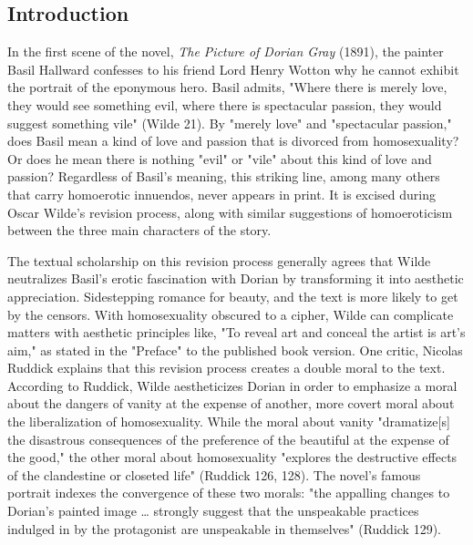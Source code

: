 \documentclass[11pt]{article}
\begin{document}
\subsection{Introduction}
\label{sec:orgcdb88e2}

In the first scene of the novel, \emph{The Picture of Dorian Gray} (1891),
the painter Basil Hallward confesses to his friend Lord Henry Wotton
why he cannot exhibit the portrait of the eponymous hero. Basil
admits, "Where there is merely love, they would see something evil,
where there is spectacular passion, they would suggest something vile"
(Wilde 21). By "merely love" and "spectacular passion," does Basil
mean a kind of love and passion that is divorced from homosexuality?
Or does he mean there is nothing "evil" or "vile" about this kind of
love and passion? Regardless of Basil's meaning, this striking line,
among many others that carry homoerotic innuendos, never appears in
print. It is excised during Oscar Wilde's revision process, along with
similar suggestions of homoeroticism between the three main characters
of the story.

The textual scholarship on this revision process generally agrees that
Wilde neutralizes Basil's erotic fascination with Dorian by
transforming it into aesthetic appreciation. Sidestepping romance for
beauty, and the text is more likely to get by the censors. With
homosexuality obscured to a cipher, Wilde can complicate matters with
aesthetic principles like, "To reveal art and conceal the artist is
art's aim," as stated in the "Preface" to the published book
version. One critic, Nicolas Ruddick explains that this revision
process creates a double moral to the text. According to Ruddick,
Wilde aestheticizes Dorian in order to emphasize a moral about the
dangers of vanity at the expense of another, more covert moral about
the liberalization of homosexuality. While the moral about vanity
"dramatize[s] the disastrous consequences of the preference of the
beautiful at the expense of the good," the other moral about
homosexuality "explores the destructive effects of the clandestine or
closeted life" (Ruddick 126, 128). The novel's famous portrait indexes
the convergence of these two morals: "the appalling changes to
Dorian's painted image \ldots{} strongly suggest that the unspeakable
practices indulged in by the protagonist are unspeakable in
themselves" (Ruddick 129).
\end{document}
